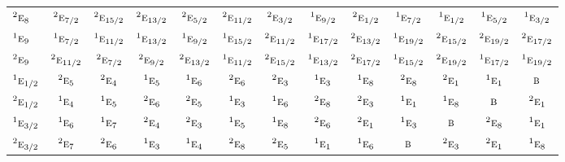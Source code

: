 \documentclass[10pt,a4paper]{article}
\numberwithin{equation}{section}
\newcommand{\irr}[1]{\text{\normalfont\scshape #1}}
\newcommand{\conjpair}[1]{{}^{#1}}
\begin{document}
{\begin{longtable}{@{}lcccccccccccc@{}}
$\conjpair{2}\irr{e}_{8}$ & $\conjpair{2}\irr{e}_{7/2}$ & $\conjpair{2}\irr{e}_{15/2}$ & $\conjpair{2}\irr{e}_{13/2}$ & $\conjpair{2}\irr{e}_{5/2}$ & $\conjpair{2}\irr{e}_{11/2}$ & $\conjpair{2}\irr{e}_{3/2}$ & $\conjpair{1}\irr{e}_{9/2}$ & $\conjpair{2}\irr{e}_{1/2}$ & $\conjpair{1}\irr{e}_{7/2}$ & $\conjpair{1}\irr{e}_{1/2}$ & $\conjpair{1}\irr{e}_{5/2}$ & $\conjpair{1}\irr{e}_{3/2}$\\
$\conjpair{1}\irr{e}_{9}$ & $\conjpair{1}\irr{e}_{7/2}$ & $\conjpair{1}\irr{e}_{11/2}$ & $\conjpair{1}\irr{e}_{13/2}$ & $\conjpair{1}\irr{e}_{9/2}$ & $\conjpair{1}\irr{e}_{15/2}$ & $\conjpair{2}\irr{e}_{11/2}$ & $\conjpair{1}\irr{e}_{17/2}$ & $\conjpair{2}\irr{e}_{13/2}$ & $\conjpair{1}\irr{e}_{19/2}$ & $\conjpair{2}\irr{e}_{15/2}$ & $\conjpair{2}\irr{e}_{19/2}$ & $\conjpair{2}\irr{e}_{17/2}$\\
$\conjpair{2}\irr{e}_{9}$ & $\conjpair{2}\irr{e}_{11/2}$ & $\conjpair{2}\irr{e}_{7/2}$ & $\conjpair{2}\irr{e}_{9/2}$ & $\conjpair{2}\irr{e}_{13/2}$ & $\conjpair{1}\irr{e}_{11/2}$ & $\conjpair{2}\irr{e}_{15/2}$ & $\conjpair{1}\irr{e}_{13/2}$ & $\conjpair{2}\irr{e}_{17/2}$ & $\conjpair{1}\irr{e}_{15/2}$ & $\conjpair{2}\irr{e}_{19/2}$ & $\conjpair{1}\irr{e}_{17/2}$ & $\conjpair{1}\irr{e}_{19/2}$\\
$\conjpair{1}\irr{e}_{1/2}$ & $\conjpair{2}\irr{e}_{5}$ & $\conjpair{2}\irr{e}_{4}$ & $\conjpair{1}\irr{e}_{5}$ & $\conjpair{1}\irr{e}_{6}$ & $\conjpair{2}\irr{e}_{6}$ & $\conjpair{2}\irr{e}_{3}$ & $\conjpair{1}\irr{e}_{3}$ & $\conjpair{1}\irr{e}_{8}$ & $\conjpair{2}\irr{e}_{8}$ & $\conjpair{2}\irr{e}_{1}$ & $\conjpair{1}\irr{e}_{1}$ & $\irr{b}$\\
$\conjpair{2}\irr{e}_{1/2}$ & $\conjpair{1}\irr{e}_{4}$ & $\conjpair{1}\irr{e}_{5}$ & $\conjpair{2}\irr{e}_{6}$ & $\conjpair{2}\irr{e}_{5}$ & $\conjpair{1}\irr{e}_{3}$ & $\conjpair{1}\irr{e}_{6}$ & $\conjpair{2}\irr{e}_{8}$ & $\conjpair{2}\irr{e}_{3}$ & $\conjpair{1}\irr{e}_{1}$ & $\conjpair{1}\irr{e}_{8}$ & $\irr{b}$ & $\conjpair{2}\irr{e}_{1}$\\
$\conjpair{1}\irr{e}_{3/2}$ & $\conjpair{1}\irr{e}_{6}$ & $\conjpair{1}\irr{e}_{7}$ & $\conjpair{2}\irr{e}_{4}$ & $\conjpair{2}\irr{e}_{3}$ & $\conjpair{1}\irr{e}_{5}$ & $\conjpair{1}\irr{e}_{8}$ & $\conjpair{2}\irr{e}_{6}$ & $\conjpair{2}\irr{e}_{1}$ & $\conjpair{1}\irr{e}_{3}$ & $\irr{b}$ & $\conjpair{2}\irr{e}_{8}$ & $\conjpair{1}\irr{e}_{1}$\\
$\conjpair{2}\irr{e}_{3/2}$ & $\conjpair{2}\irr{e}_{7}$ & $\conjpair{2}\irr{e}_{6}$ & $\conjpair{1}\irr{e}_{3}$ & $\conjpair{1}\irr{e}_{4}$ & $\conjpair{2}\irr{e}_{8}$ & $\conjpair{2}\irr{e}_{5}$ & $\conjpair{1}\irr{e}_{1}$ & $\conjpair{1}\irr{e}_{6}$ & $\irr{b}$ & $\conjpair{2}\irr{e}_{3}$ & $\conjpair{2}\irr{e}_{1}$ & $\conjpair{1}\irr{e}_{8}$\\

\end{longtable}}
\end{document}
